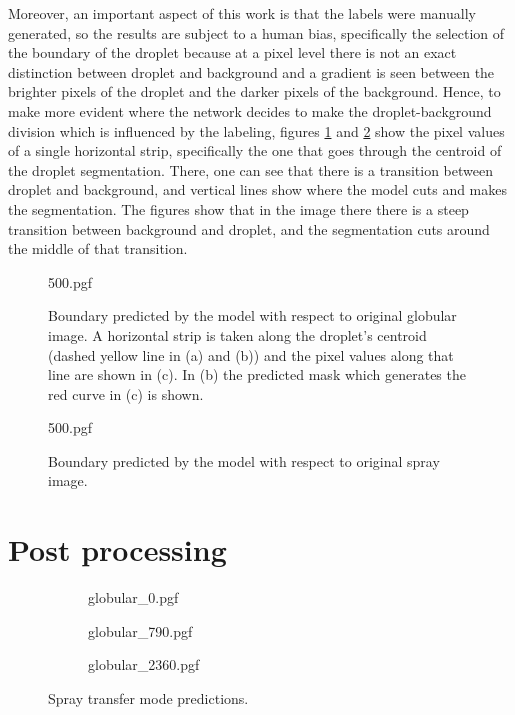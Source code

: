 Moreover, an important aspect of this work is that the labels were manually generated, so the results are subject to a human bias, specifically the selection of the boundary of the droplet because at a pixel level there is not an exact distinction between droplet and background and a gradient is seen between the brighter pixels of the droplet and the darker pixels of the background. Hence, to make more evident where the network decides to make  the droplet-background division which is influenced by the labeling, figures \ref{fig:boundary_globular} and \ref{fig:boundary_spray} show the pixel values of a single horizontal strip, specifically the one that goes through the centroid of the droplet segmentation. There, one can see that there is a transition between droplet and background, and vertical lines show where the model cuts and makes the segmentation. The figures show that in the image there there is a steep transition between background and droplet, and the segmentation cuts around the middle of that transition.


\begin{figure}
    \centering
    {500.pgf}
    \caption[Boundary predicted by the model with respect to original globular image]{Boundary predicted by the model with respect to original globular image. A horizontal strip is taken along the droplet's centroid (dashed yellow line in (a) and (b)) and the pixel values along that line are shown in (c). In (b) the predicted mask which generates the red curve in (c) is shown.}
    \label{fig:boundary_globular}
\end{figure}

\begin{figure}
    \centering
    {500.pgf}
    \caption[Boundary predicted by the model with respect to original spray image]{Boundary predicted by the model with respect to original spray image.}
    \label{fig:boundary_spray}
\end{figure}


\clearpage
\section{Post processing}

\begin{figure}
\centering
  \begin{subfigure}[b]{0.45\textwidth}
    {globular_0.pgf}
    \caption{}

  \end{subfigure}
\hfill
  \begin{subfigure}[b]{0.45\textwidth}
    {globular_790.pgf}
    \caption{}
  \end{subfigure}
  \begin{subfigure}[b]{0.45\textwidth}
    {globular_2360.pgf}
    \caption{}
  \end{subfigure}
    \caption[Spray transfer mode predictions]{Spray transfer mode predictions.}
    \label{fig:globular_centroids}
\end{figure}

